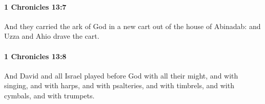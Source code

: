 		\paragraph{1 Chronicles 13:7} %
			\label{1CHRONICLES-13-7}

			And they carried the ark of God in a new cart out of the house of Abinadab: and Uzza and Ahio drave the cart.


		\paragraph{1 Chronicles 13:8} %
			\label{1CHRONICLES-13-8}

			And David and all Israel played before God with all their might, and with singing, and with harps, and with psalteries, and with timbrels, and with cymbals, and with trumpets.


